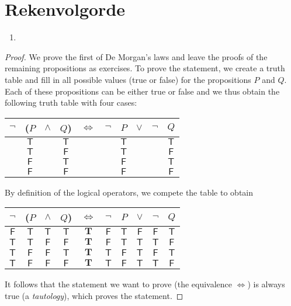 \documentclass{tstextbook}
\begin{document}
\section{Rekenvolgorde}
\begin{theorem}
    \begin{enumerate}
     \item 
    \end{enumerate}
\end{theorem}
\begin{proof}
  \newcommand{\T}{\mathsf{T}}
  \newcommand{\TT}{\mathbf{T}}
  \renewcommand{\F}{\mathsf{F}}
  We prove the first of De Morgan's laws and leave the proofs of
  the remaining propositions as exercises. To prove the statement,
  we create a truth table and fill in all possible values (true or
  false) for the propositions $P$ and $Q$. Each of these propositions
  can be either true or false and we thus obtain the following truth
  table with four cases:
  \begin{center}
    \begin{tabular}{cccccccccc}
      $\lnot$ & ($P$ & $\land$ & $Q$) & $\Leftrightarrow$ & $\lnot$ & $P$ & $\lor$ & $\lnot$ & $Q$ \\
      \midrule
      & $\T$ && $\T$ &&& $\T$ &&& $\T$ \\
      & $\T$ && $\F$ &&& $\T$ &&& $\F$ \\
      & $\F$ && $\T$ &&& $\F$ &&& $\T$ \\
      & $\F$ && $\F$ &&& $\F$ &&& $\F$
    \end{tabular}
  \end{center}
  By definition of the logical operators, we compete the table to obtain
  \begin{center}
    \begin{tabular}{cccccccccc}
      $\lnot$ & ($P$ & $\land$ & $Q$) & $\Leftrightarrow$ & $\lnot$ & $P$ & $\lor$ & $\lnot$ & $Q$ \\
      \midrule
      $\F$ & $\T$ & $\T$ & $\T$ & $\TT$ & $\F$ & $\T$ & $\F$ & $\F$& $\T$ \\
      $\T$ & $\T$ & $\F$ & $\F$ & $\TT$ & $\F$ & $\T$ & $\T$ & $\T$& $\F$ \\
      $\T$ & $\F$ & $\F$ & $\T$ & $\TT$ & $\T$ & $\F$ & $\T$ & $\F$& $\T$ \\
      $\T$ & $\F$ & $\F$ & $\F$ & $\TT$ & $\T$ & $\F$ & $\T$ & $\T$& $\F$
    \end{tabular}
  \end{center}
  It follows that the statement we want to prove (the equivalence $\Leftrightarrow$)
  is always true (a \emph{tautology}), which proves the statement.
\end{proof}
\end{document}
